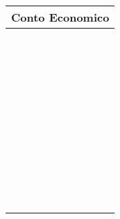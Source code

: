 \documentclass{book}
\begin{document}
\begin{longtable}{|m{10cm}|m{2cm}|}
    \hline
    \multicolumn{2}{|c|}{\textbf{Conto Economico}} \\
    \hline
    & \\ %
    \hline
    & \\
    \hline
    & \\
    \hline
    & \\
    \hline
    & \\
    \hline
    & \\
    \hline
    & \\
    \hline
    & \\
    \hline
    & \\
    \hline
    & \\
    \hline
    & \\
    \hline
    & \\
    \hline
    & \\
    \hline
    & \\
    \hline
    & \\
    \hline
    & \\
    \hline
    & \\
    \hline
    & \\
    \hline
    & \\
    \hline
    & \\
    \hline
    & \\
    \hline
    & \\
    \hline
    & \\
    \hline
    & \\
    \hline
    & \\
    \hline
    & \\
    \hline
    & \\
    \hline
    & \\
    \hline
    & \\
    \hline
    & \\
    \hline
    & \\
    \hline
    & \\
    \hline
    & \\
    \hline
    & \\
    \hline
    & \\
    \hline
    & \\
    \hline
    & \\
    \hline
    & \\
    \hline
    & \\
    \hline
    & \\
    \hline
    & \\
    \hline
    & \\
    \hline
    & \\
    \hline
    & \\
    \hline
\end{longtable}
\label{tab:Conto Economico}
\end{document}
